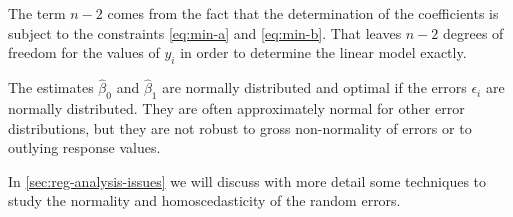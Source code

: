 The term $n-2$ comes from the fact that the determination of the coefficients is subject to the constraints \eqref{eq:min-a} and \eqref{eq:min-b}. That leaves $n-2$ degrees of freedom for the values of $y_{i}$ in order to determine the linear model exactly.

\bigskip
The estimates $\hat{\beta}_{0}$ and $\hat{\beta}_{1}$ are normally distributed and optimal if the errors $\epsilon_{i}$ are normally distributed. They are often approximately normal for other error distributions, but they are not robust to gross non-normality of errors or to outlying response values.

In \cref{sec:reg-analysis-issues} we will discuss with more detail some techniques to study the normality and homoscedasticity of the random errors. %





